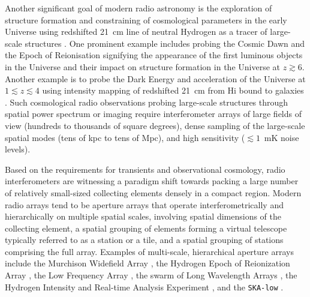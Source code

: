 \documentclass[
  journal=pasa,
  manuscript=article-type,
  year=2020,
  volume=37,
]{cup-journal}
\begin{document}
Another significant goal of modern radio astronomy is the exploration of structure formation and constraining of cosmological parameters in the early Universe using redshifted 21~cm line of neutral Hydrogen as a tracer of large-scale structures \citep[][and references therein]{Morales+2010,Pritchard+2012}. One prominent example includes probing the Cosmic Dawn and the Epoch of Reionisation signifying the appearance of the first luminous objects in the Universe and their impact on structure formation in the Universe at $z\gtrsim 6$. Another example is to probe the Dark Energy and acceleration of the Universe at $1\lesssim z\lesssim 4$ using intensity mapping of redshifted 21~cm from H{\sc i} bound to galaxies \citep{CosmicVisions+2018}. Such cosmological radio observations probing large-scale structures through spatial power spectrum or imaging require interferometer arrays of large fields of view (hundreds to thousands of square degrees), dense sampling of the large-scale spatial modes (tens of kpc to tens of Mpc), and high sensitivity ($\lesssim 1$~mK noise levels). 

Based on the requirements for transients and observational cosmology, radio interferometers are witnessing a paradigm shift towards packing a large number of relatively small-sized collecting elements densely in a compact region. Modern radio arrays tend to be aperture arrays that operate interferometrically and hierarchically on multiple spatial scales, involving spatial dimensions of the collecting element, a spatial grouping of elements forming a virtual telescope typically referred to as a station or a tile, and a spatial grouping of stations comprising the full array.
Examples of multi-scale, hierarchical aperture arrays include the Murchison Widefield Array \cite[MWA;][]{Tingay+2013}, the Hydrogen Epoch of Reionization Array \citep[HERA;][]{HERA+2017}, the Low Frequency Array \cite[LOFAR;][]{vanHaarlem+2013}, the swarm of Long Wavelength Arrays \cite[LWA Swarm;][]{Dowell+2018}, 
the Hydrogen Intensity and Real-time Analysis Experiment \citep[HIRAX;][]{HIRAX+2022}, and the \texttt{SKA-low} \citep{Dewdney+2009,SKA1+2019}. 
\end{document}
